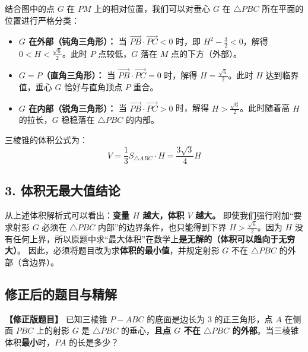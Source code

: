 \documentclass[11pt,a4paper]{ctexart}
\begin{document}
结合图中的点 $G$ 在 $PM$ 上的相对位置，我们可以对垂心 $G$ 在 $\triangle PBC$ 所在平面的位置进行严格分类：
\begin{itemize}
    \item \textbf{$G$ 在外部（钝角三角形）：} 当 $\vec{PB} \cdot \vec{PC} < 0$ 时，即 $H^2 - \frac{3}{2} < 0$，解得 $0 < H < \frac{\sqrt{6}}{2}$。此时 $P$ 点较低，$G$ 落在 $M$ 点的下方（外部）。
    \item \textbf{$G = P$（直角三角形）：} 当 $\vec{PB} \cdot \vec{PC} = 0$ 时，解得 $H = \frac{\sqrt{6}}{2}$。此时 $H$ 达到临界值，垂心 $G$ 恰好与直角顶点 $P$ 重合。
    \item \textbf{$G$ 在内部（锐角三角形）：} 当 $\vec{PB} \cdot \vec{PC} > 0$ 时，解得 $H > \frac{\sqrt{6}}{2}$。此时随着高 $H$ 的拉长，$G$ 稳稳落在 $\triangle PBC$ 的内部。
\end{itemize}
三棱锥的体积公式为：
$$V = \frac{1}{3} S_{\triangle ABC} \cdot H = \frac{3\sqrt{3}}{4} H$$

\subsection*{3. 体积无最大值结论}
从上述体积解析式可以看出：\textbf{变量 $H$ 越大，体积 $V$ 越大。}
即使我们强行附加“要求射影 $G$ 必须在 $\triangle PBC$ 内部”的边界条件，也只能得到下界 $H > \frac{\sqrt{6}}{2}$。因为 $H$ 没有任何上界，所以原题中求“最大体积”在数学上\textbf{是无解的（体积可以趋向于无穷大）}。
因此，必须将题目改为求\textbf{体积的最小值}，并规定射影 $G$ 不在 $\triangle PBC$ 的外部（含边界）。

\newpage
\subsection{修正后的题目与精解}

\noindent \textbf{【修正版题目】} 已知三棱锥 $P-ABC$ 的底面是边长为 3 的正三角形，点 $A$ 在侧面 $PBC$ 上的射影 $G$ 是 $\triangle PBC$ 的垂心，\textbf{且点 $G$ 不在 $\triangle PBC$ 的外部}。当三棱锥体积\textbf{最小}时，$PA$ 的长是多少？

\vspace{0.5cm}
\end{document}
